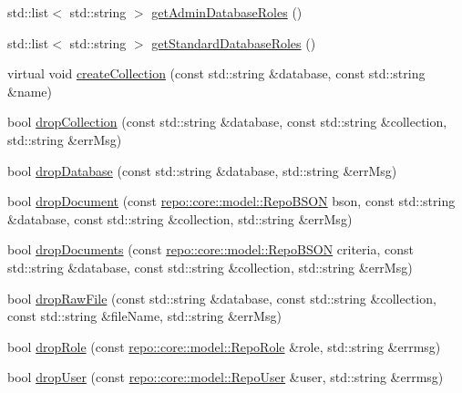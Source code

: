 \begin{DoxyCompactItemize}
\item 
std\+::list$<$ std\+::string $>$ \hyperlink{classrepo_1_1core_1_1handler_1_1_mongo_database_handler_afeaa95dcb44d7a1276fa1e90a5987f6d}{get\+Admin\+Database\+Roles} ()
\item 
std\+::list$<$ std\+::string $>$ \hyperlink{classrepo_1_1core_1_1handler_1_1_mongo_database_handler_a9974cd3f7f955793cbe56eab74ced573}{get\+Standard\+Database\+Roles} ()
\item 
virtual void \hyperlink{classrepo_1_1core_1_1handler_1_1_mongo_database_handler_abeaad0e73b0e274755e7ee2baab002ae}{create\+Collection} (const std\+::string \&database, const std\+::string \&name)
\item 
bool \hyperlink{classrepo_1_1core_1_1handler_1_1_mongo_database_handler_a7c4cdb628a1b3c59caba6b397fe20375}{drop\+Collection} (const std\+::string \&database, const std\+::string \&collection, std\+::string \&err\+Msg)
\item 
bool \hyperlink{classrepo_1_1core_1_1handler_1_1_mongo_database_handler_ac982e4d73ee5c69d333030437eebabf6}{drop\+Database} (const std\+::string \&database, std\+::string \&err\+Msg)
\item 
bool \hyperlink{classrepo_1_1core_1_1handler_1_1_mongo_database_handler_a7e1a68ada64088e53ded91c738fadcd6}{drop\+Document} (const \hyperlink{classrepo_1_1core_1_1model_1_1_repo_b_s_o_n}{repo\+::core\+::model\+::\+Repo\+B\+S\+O\+N} bson, const std\+::string \&database, const std\+::string \&collection, std\+::string \&err\+Msg)
\item 
bool \hyperlink{classrepo_1_1core_1_1handler_1_1_mongo_database_handler_a15263c0497c215798ac7398ff89bb4d3}{drop\+Documents} (const \hyperlink{classrepo_1_1core_1_1model_1_1_repo_b_s_o_n}{repo\+::core\+::model\+::\+Repo\+B\+S\+O\+N} criteria, const std\+::string \&database, const std\+::string \&collection, std\+::string \&err\+Msg)
\item 
bool \hyperlink{classrepo_1_1core_1_1handler_1_1_mongo_database_handler_a847556c14e85da5e17f8d21c70ab23d0}{drop\+Raw\+File} (const std\+::string \&database, const std\+::string \&collection, const std\+::string \&file\+Name, std\+::string \&err\+Msg)
\item 
bool \hyperlink{classrepo_1_1core_1_1handler_1_1_mongo_database_handler_ade2b069da1314566c63a48a3b61ad451}{drop\+Role} (const \hyperlink{classrepo_1_1core_1_1model_1_1_repo_role}{repo\+::core\+::model\+::\+Repo\+Role} \&role, std\+::string \&errmsg)
\item 
bool \hyperlink{classrepo_1_1core_1_1handler_1_1_mongo_database_handler_ad5e1716d61ffe74086453ae4d0bbad24}{drop\+User} (const \hyperlink{classrepo_1_1core_1_1model_1_1_repo_user}{repo\+::core\+::model\+::\+Repo\+User} \&user, std\+::string \&errmsg)

\end{DoxyCompactItemize}
